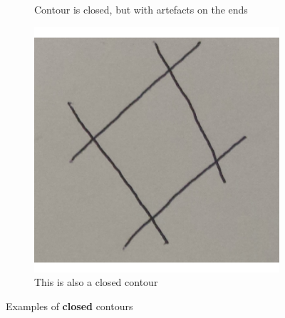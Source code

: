 \documentclass[11pt]{article}
\begin{document}
\begin{figure}[!ht]
\begin{subfigure}[t]{.3\textwidth}
		\caption{Contour is closed, but with artefacts on the ends}
	\end{subfigure}
	\hfill
	\begin{subfigure}[t]{.3\textwidth}
		\centering
		\includegraphics[scale=0.3]{pics/closedloop3.png}
		\caption{This is also a closed contour}
	\end{subfigure}
	\caption{Examples of \textbf{closed} contours}
	\label{fig:closedcontours}
\end{figure}
\end{document}
